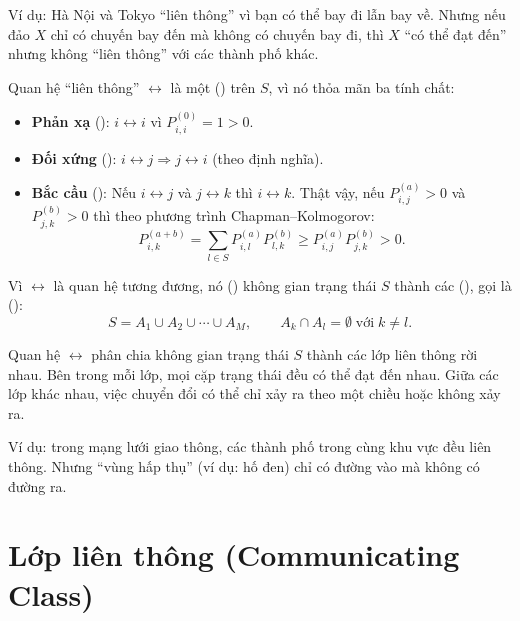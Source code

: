 Ví dụ: Hà Nội và Tokyo ``liên thông'' vì bạn có thể bay đi lẫn bay về.
Nhưng nếu đảo $X$ chỉ có chuyến bay đến mà không có chuyến bay đi,
thì $X$ ``có thể đạt đến'' nhưng không ``liên thông'' với các thành phố khác.

Quan hệ ``liên thông'' $\leftrightarrow$ là một  ()
trên $S$, vì nó thỏa mãn ba tính chất:

\begin{itemize}[nosep]
  \item \textbf{Phản xạ} (): $i \leftrightarrow i$ vì $P_{i,i}^{(0)} = 1 > 0$.
  \item \textbf{Đối xứng} (): $i \leftrightarrow j \Rightarrow j \leftrightarrow i$ (theo định nghĩa).
  \item \textbf{Bắc cầu} (): Nếu $i \leftrightarrow j$ và $j \leftrightarrow k$ thì $i \leftrightarrow k$.
        Thật vậy, nếu $P_{i,j}^{(a)} > 0$ và $P_{j,k}^{(b)} > 0$ thì theo phương trình Chapman--Kolmogorov:
        \[
          P_{i,k}^{(a+b)} = \sum_{l \in S} P_{i,l}^{(a)} P_{l,k}^{(b)}
          \geq P_{i,j}^{(a)} P_{j,k}^{(b)} > 0.
        \]
\end{itemize}

Vì $\leftrightarrow$ là quan hệ tương đương, nó  () không gian trạng thái
$S$ thành các  (), gọi là 
():
\begin{equation}\label{eq:partition}
  S = A_1 \cup A_2 \cup \cdots \cup A_M,
  \qquad A_k \cap A_l = \emptyset \;\text{với}\; k \neq l.
\end{equation}

\begin{tomtat}
Quan hệ $\leftrightarrow$ phân chia không gian trạng thái $S$ thành các lớp liên thông rời nhau.
Bên trong mỗi lớp, mọi cặp trạng thái đều có thể đạt đến nhau.
Giữa các lớp khác nhau, việc chuyển đổi có thể chỉ xảy ra theo một chiều hoặc không xảy ra.

Ví dụ: trong mạng lưới giao thông, các thành phố trong cùng khu vực đều liên thông.
Nhưng ``vùng hấp thụ'' (ví dụ: hố đen) chỉ có đường vào mà không có đường ra.
\end{tomtat}

\section{Lớp liên thông (Communicating Class)}
\label{sec:communicating-class}

